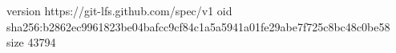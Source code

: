 version https://git-lfs.github.com/spec/v1
oid sha256:b2862ec9961823be04bafcc9cf84c1a5a5941a01fe29abe7f725c8bc48c0be58
size 43794
